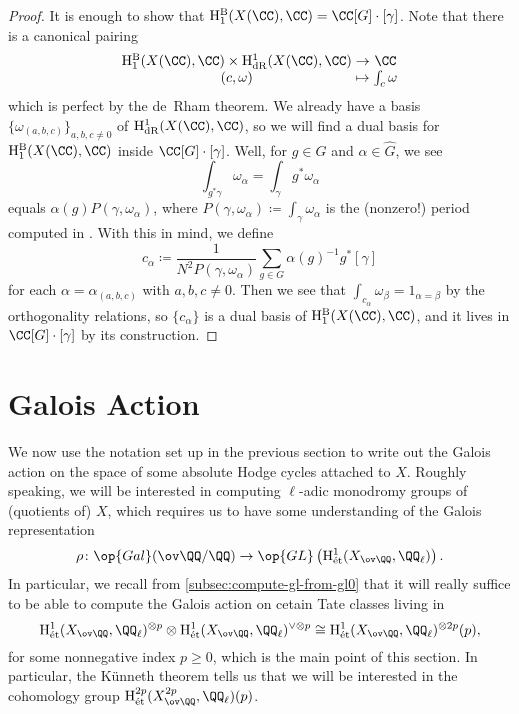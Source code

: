 \documentclass[../thesis.tex]{subfiles}
\begin{document}
\begin{proof}
	It is enough to show that $\mathrm H_1^{\mathrm B}(X(\CC),\CC)=\CC[G]\cdot[\gamma]$. Note that there is a canonical pairing
	\[\arraycolsep=1.4pt\begin{array}{ccc}
		\mathrm H_1^{\mathrm B}(X(\CC),\CC) \times \mathrm H^1_{\mathrm{dR}}(X(\CC),\CC) &\to& \CC \\
		(c,\omega) &\mapsto& \int_c\omega
	\end{array}\]
	which is perfect by the de~Rham theorem. We already have a basis $\{\omega_{(a,b,c)}\}_{a,b,c\ne0}$ of $\mathrm H^1_{\mathrm{dR}}(X(\CC),\CC)$, so we will find a dual basis for $\mathrm H_1^{\mathrm B}(X(\CC),\CC)$ inside $\CC[G]\cdot[\gamma]$. Well, for $g\in G$ and $\alpha\in\widehat G$, we see
	\[\int_{g^*\gamma}\omega_\alpha=\int_{\gamma}g^*\omega_\alpha\]
	equals $\alpha(g)P(\gamma,\omega_\alpha)$, where $P(\gamma,\omega_\alpha)\coloneqq\int_\gamma\omega_\alpha$ is the (nonzero!) period computed in . With this in mind, we define
	\[c_\alpha\coloneqq\frac1{N^2P(\gamma,\omega_\alpha)}\sum_{g\in G}\alpha(g)^{-1}g^*[\gamma]\]
	for each $\alpha=\alpha_{(a,b,c)}$ with $a,b,c\ne0$. Then we see that $\int_{c_\alpha}\omega_\beta=1_{\alpha=\beta}$ by the orthogonality relations, so $\{c_\alpha\}$ is a dual basis of $\mathrm H_1^{\mathrm B}(X(\CC),\CC)$, and it lives in $\CC[G]\cdot[\gamma]$ by its construction.
\end{proof}

\section{Galois Action}
We now use the notation set up in the previous section to write out the Galois action on the space of some absolute Hodge cycles attached to $X$. Roughly speaking, we will be interested in computing $\ell$-adic monodromy groups of (quotients of) $X$, which requires us to have some understanding of the Galois representation
\[\rho\colon\op{Gal}(\ov\QQ/\QQ)\to\op{GL}\left(\mathrm H^1_{\mathrm{\acute et}}(X_{\ov\QQ},\QQ_\ell)\right).\]
In particular, we recall from \cref{subsec:compute-gl-from-gl0} that it will really suffice to be able to compute the Galois action on cetain Tate classes living in
\[\mathrm H^1_{\mathrm{\acute et}}(X_{\ov\QQ},\QQ_\ell)^{\otimes p}\otimes\mathrm H^1_{\mathrm{\acute et}}(X_{\ov\QQ},\QQ_\ell)^{\lor\otimes p}\cong\mathrm H^1_{\mathrm{\acute et}}(X_{\ov\QQ},\QQ_\ell)^{\otimes2p}(p),\]
for some nonnegative index $p\ge0$, which is the main point of this section. In particular, the K\"unneth theorem tells us that we will be interested in the cohomology group $\mathrm H^{2p}_{\mathrm{\acute et}}(X^{2p}_{\ov\QQ},\QQ_\ell)(p)$.
\end{document}
